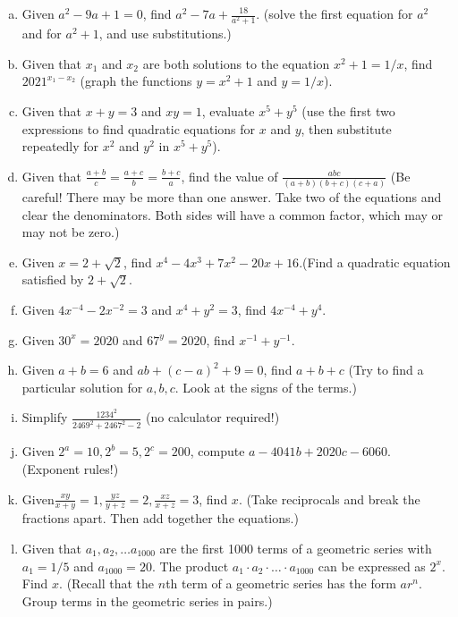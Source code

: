 \begin{exercise}{11}
\begin{enumerate}[(a)]
\item
Given $a^2-9a+1=0$, find $\displaystyle a^2 - 7a + \frac{18}{a^2+1}$.  (solve the first equation for $a^2$ and for $a^2+1$, and use  substitutions.)
\item
Given that $x_1$ and $x_2$ are both solutions to the equation $x^2+1 = 1/x$, find $2021^{x_1 - x_2}$  (graph the functions $y = x^2+1$ and $y = 1/x$).
\item
Given that $x+y=3$ and $xy=1$, evaluate $x^5 + y^5$  (use the first two expressions to find quadratic equations for $x$ and $y$, then substitute repeatedly for $x^2$ and $y^2$ in $x^5 + y^5$).
\item
Given that $\displaystyle \frac{a+b}{c} = \frac{a+c}{b} = \frac{b+c}{a}$, find the value of $\displaystyle \frac{abc}{(a+b)(b+c)(c+a)}$  (Be careful! There may be more than one answer. Take two of the equations and clear the denominators. Both sides will have a common factor, which may or may not be zero.)
\item
Given $x= 2 + \sqrt{2}$, find $x^4 - 4x^3+7x^2 - 20x + 16$.(Find a quadratic equation satisfied by $2 + \sqrt{2}$.
\item
Given $4x^{-4} - 2x^{-2}=3$ and $x^4 + y^2 = 3$, find $4x^{-4} + y^4$.
\item
Given $30^x = 2020$ and $67^y = 2020$, find $x^{-1} + y^{-1}$.
\item
Given $a+b=6$ and $ab + (c-a)^2 + 9=0$, find $a+b+c$  (Try to find a particular solution for $a,b,c$.  Look at the signs of the terms.)
\item
Simplify $\displaystyle \frac{1234^2}{2469^2 + 2467^2 - 2}$ (no calculator required!)
\item
Given $2^a = 10, 2^ b = 5, 2^c = 200$, compute $a -4041b + 2020c - 6060$. (Exponent rules!)
\item
Given$\displaystyle \frac{xy}{x+y}=1, \frac{yz}{y+z} = 2, \frac{xz}{x+z} = 3$, find $x$. (Take reciprocals and break the fractions apart.  Then add together the equations.)
\item
Given that $a_1, a_2,\ldots a_{1000}$ are the first 1000 terms of a geometric series with $a_1= 1/5$ and $a_{1000} = 20$. The product $a_1 \cdot a_2 \cdot \ldots \cdot a_{1000}$ can be expressed as $2^x$.  Find $x$. (Recall that the $n$th term of a geometric series has the form $a r^n$.  Group terms in the geometric series in pairs.)
   
\end{enumerate}
\end{exercise} 
